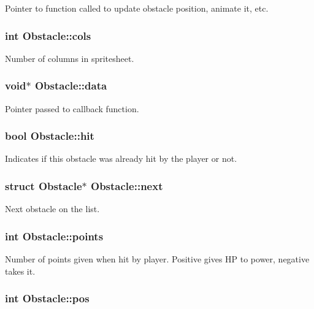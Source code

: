 Pointer to function called to update obstacle position, animate it, etc. \hypertarget{structObstacle_ad51aa07361c732a47e78c80fae2fab7c}{
\subsubsection[{cols}]{\setlength{\rightskip}{0pt plus 5cm}int Obstacle\-::cols}}\label{structObstacle_ad51aa07361c732a47e78c80fae2fab7c}
Number of columns in spritesheet. \hypertarget{structObstacle_a88728e624cc62993e2bf52aff816cdff}{
\subsubsection[{data}]{\setlength{\rightskip}{0pt plus 5cm}void$\ast$ Obstacle\-::data}}\label{structObstacle_a88728e624cc62993e2bf52aff816cdff}
Pointer passed to callback function. \hypertarget{structObstacle_ac89d025f4ad7c2f083d262c1bee4e851}{
\subsubsection[{hit}]{\setlength{\rightskip}{0pt plus 5cm}bool Obstacle\-::hit}}\label{structObstacle_ac89d025f4ad7c2f083d262c1bee4e851}
Indicates if this obstacle was already hit by the player or not. \hypertarget{structObstacle_aedbcf65351fa59ca9f18f6fba0287dc1}{
\subsubsection[{next}]{\setlength{\rightskip}{0pt plus 5cm}struct {\bf Obstacle}$\ast$ Obstacle\-::next}}\label{structObstacle_aedbcf65351fa59ca9f18f6fba0287dc1}
Next obstacle on the list. \hypertarget{structObstacle_a38a164a0e4d6f6508fb65c6eff39147f}{
\subsubsection[{points}]{\setlength{\rightskip}{0pt plus 5cm}int Obstacle\-::points}}\label{structObstacle_a38a164a0e4d6f6508fb65c6eff39147f}
Number of points given when hit by player. Positive gives H\-P to power, negative takes it. \hypertarget{structObstacle_a5228dff4dc773a66043e822fb4d6d00c}{
\subsubsection[{pos}]{\setlength{\rightskip}{0pt plus 5cm}int Obstacle\-::pos}}\label{structObstacle_a5228dff4dc773a66043e822fb4d6d00c}
